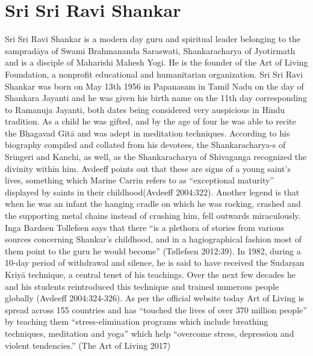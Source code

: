 \section*{Sri Sri Ravi Shankar}

Sri Sri Ravi Shankar is a modern day guru and spiritual leader belonging to the sampradāya of Swami Brahmananda Saraswati, Shankaracharya of Jyotirmath and is a disciple of Maharishi Mahesh Yogi. He is the founder of the Art of Living Foundation, a nonprofit educational and humanitarian organization. Sri Sri Ravi Shankar was born on May 13th 1956 in Papanasam in Tamil Nadu on the day of Shankara Jayanti and he was given his birth name on the 11th day corresponding to Ramanuja Jayanti, both dates being considered very auspicious in Hindu tradition. As a child he was gifted, and by the age of four he was able to recite the Bhagavad Gītā and was adept in meditation techniques. According to his biography compiled and collated from his devotees, the Shankaracharya-s of Sringeri and Kanchi, as well, as the Shankaracharya of Shivaganga recognized the divinity within him. Avdeeff points out that these are signs of a young saint’s lives, something which Marine Carrin refers to as “exceptional maturity” displayed by saints in their childhood(Avdeeff 2004:322). Another legend is that when he was an infant the hanging cradle on which he was rocking, crashed and the supporting metal chains instead of crushing him, fell outwards miraculously. Inga Bardsen Tollefsen says that there “is a plethora of stories from various sources concerning Shankar’s childhood, and in a hagiographical fashion most of them point to the guru he would become” (Tøllefsen 2012:39). In 1982, during a 10-day period of withdrawal and silence, he is said to have received the Sudarṣan Kriyā technique, a central tenet of his teachings. Over the next few decades he and his students reintroduced this technique and trained numerous people globally (Avdeeff 2004:324-326). As per the official website today Art of Living is spread across 155 countries and has “touched the lives of over 370 million people” by teaching them “stress-elimination programs which include breathing techniques, meditation and yoga” which help “overcome stress, depression and violent tendencies.” (The Art of Living 2017)


